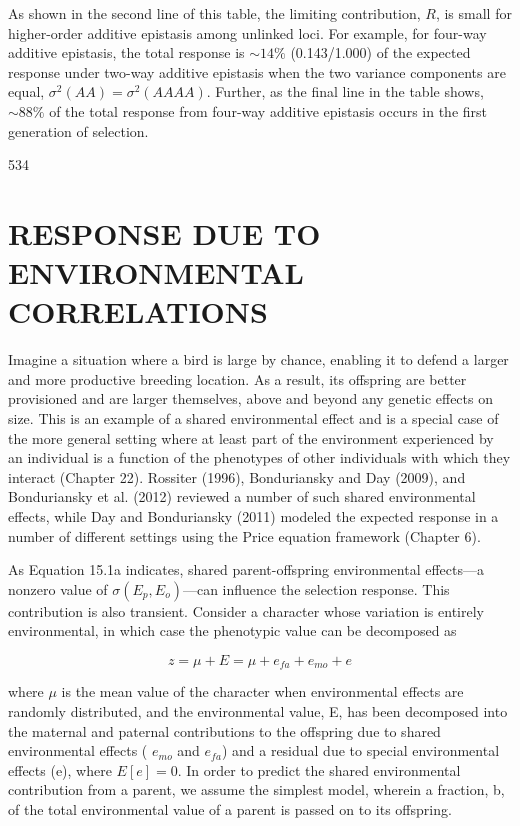 \documentclass{article}
\begin{document}
As shown in the second line of this table, the limiting contribution,  $ R $, is small for higher-order additive epistasis among unlinked loci. For example, for four-way additive epistasis, the total response is  $ \sim14\% $ (0.143/1.000) of the expected response under two-way additive epistasis when the two variance components are equal,  $ \sigma^2(AA) = \sigma^2(AAAA) $. Further, as the final line in the table shows,  $ \sim88\% $ of the total response from four-way additive epistasis occurs in the first generation of selection.

534

\section{RESPONSE DUE TO ENVIRONMENTAL CORRELATIONS}
Imagine a situation where a bird is large by chance, enabling it to defend a larger and more productive breeding location. As a result, its offspring are better provisioned and are larger themselves, above and beyond any genetic effects on size. This is an example of a shared environmental effect and is a special case of the more general setting where at least part of the environment experienced by an individual is a function of the phenotypes of other individuals with which they interact (Chapter 22). Rossiter (1996), Bonduriansky and Day (2009), and Bonduriansky et al. (2012) reviewed a number of such shared environmental effects, while Day and Bonduriansky (2011) modeled the expected response in a number of different settings using the Price equation framework (Chapter 6).

As Equation 15.1a indicates, shared parent-offspring environmental effects—a nonzero value of  $ \sigma(E_{p}, E_{o}) $—can influence the selection response. This contribution is also transient. Consider a character whose variation is entirely environmental, in which case the phenotypic value can be decomposed as

\begin{equation}
z=\mu+E=\mu+e_{fa}+e_{mo}+e
\end{equation}

where  $ \mu $ is the mean value of the character when environmental effects are randomly distributed, and the environmental value, E, has been decomposed into the maternal and paternal contributions to the offspring due to shared environmental effects ( $ e_{mo} $ and  $ e_{fa} $) and a residual due to special environmental effects (e), where  $ E[e] = 0 $. In order to predict the shared environmental contribution from a parent, we assume the simplest model, wherein a fraction, b, of the total environmental value of a parent is passed on to its offspring.
\end{document}
